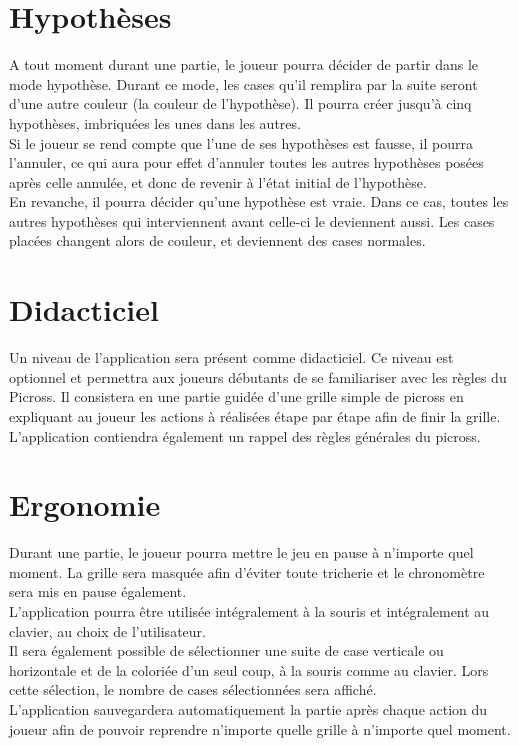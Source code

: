 \documentclass{report}
\begin{document}
		\section{Hypothèses}			
			A tout moment durant une partie, le joueur pourra décider de partir dans le mode hypothèse. Durant ce mode, les cases qu'il remplira par la suite seront d'une autre couleur (la couleur de l'hypothèse). Il pourra créer jusqu'à cinq hypothèses, imbriquées les unes dans les autres.\\
			Si le joueur se rend compte que l'une de ses hypothèses est fausse, il pourra l'annuler, ce qui aura pour effet d'annuler toutes les autres hypothèses posées après celle annulée, et donc de revenir à l'état initial de l'hypothèse.\\
			En revanche, il pourra décider qu'une hypothèse est vraie. Dans ce cas, toutes les autres hypothèses qui interviennent avant celle-ci le deviennent aussi. Les cases placées changent alors de couleur, et deviennent des cases normales.
		
		\section{Didacticiel}
			Un niveau de l'application sera présent comme didacticiel. Ce niveau est optionnel et permettra aux joueurs débutants de se familiariser avec les règles du Picross. Il consistera en une partie guidée d'une grille simple de picross en expliquant au joueur les actions à réalisées étape par étape afin de finir la grille. L'application contiendra également un rappel des règles générales du picross.

		\section{Ergonomie}
			Durant une partie, le joueur pourra mettre le jeu en pause à n'importe quel moment. La grille sera masquée afin d'éviter toute tricherie et le chronomètre sera mis en pause également.\\
     			L'application pourra être utilisée intégralement à la souris et intégralement au clavier, au choix de l'utilisateur.\\
			Il sera également possible de sélectionner une suite de case verticale ou horizontale et de la coloriée d'un seul coup, à la souris comme au clavier. Lors cette sélection, le nombre de cases sélectionnées sera affiché.\\
			L'application sauvegardera automatiquement la partie après chaque action du joueur afin de pouvoir reprendre n'importe quelle grille à n'importe quel moment.
\end{document}
